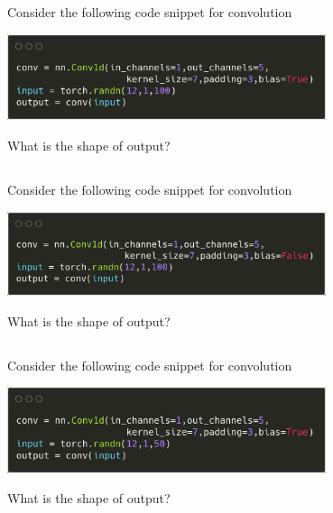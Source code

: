 \begin{frame}
\section{}
Consider the following code snippet for convolution

\includegraphics[width=0.7\textwidth]{images/quiz_4_4_5_1.png}

What is the shape of output?

\end{frame}


\begin{frame}
\section{}
Consider the following code snippet for convolution

\includegraphics[width=0.7\textwidth]{images/quiz_4_4_5_2.png}

What is the shape of output?

\end{frame}


\begin{frame}
\section{}
Consider the following code snippet for convolution

\includegraphics[width=0.7\textwidth]{images/quiz_4_4_5_3.png}

What is the shape of output?

\end{frame}


